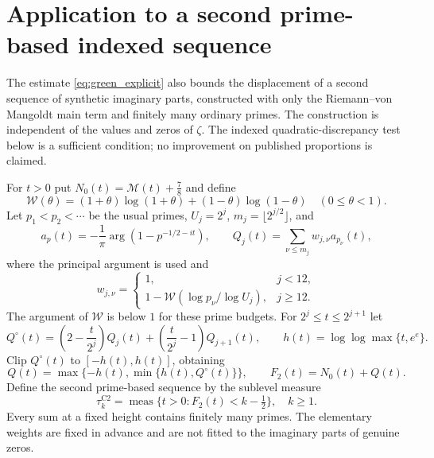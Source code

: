\documentclass[11pt,reqno]{amsart}
\numberwithin{equation}{section}
\theoremstyle{definition}
\theoremstyle{remark}
\newcommand{\main}{\mathcal M}
\begin{document}
\section{Application to a second prime-based indexed sequence}\label{sec:tauC2}

The estimate \eqref{eq:green_explicit} also bounds the displacement of
a second sequence of synthetic imaginary parts, constructed with only the
Riemann--von Mangoldt main term and finitely many ordinary primes.
The construction is independent of the values and zeros of $\zeta$.
The indexed quadratic-discrepancy test below is a sufficient condition;
no improvement on published proportions is claimed.

For $t>0$ put $N_0(t)=\main(t)+\frac78$ and define
\[
\mathscr W(\theta)
 =(1+\theta)\log(1+\theta)+(1-\theta)\log(1-\theta)
 \quad(0\le\theta<1).
\]
Let $p_1<p_2<\cdots$ be the usual primes,
$U_j=2^j$, $m_j=\lfloor2^{j/2}\rfloor$, and
\[
 a_p(t)=-\frac1\pi\arg(1-p^{-1/2-it}),\qquad
 Q_j(t)=\sum_{\nu\le m_j}w_{j,\nu}a_{p_\nu}(t),
\]
where the principal argument is used and
\begin{equation}
 w_{j,\nu}=
 \begin{cases}
 1,&j<12,\\[2pt]
 1-\mathscr W(\log p_\nu/\log U_j),&j\ge12.
 \end{cases}
 \label{eq:tauC2_weights_v8}
\end{equation}
The argument of $\mathscr W$ is below $1$ for these prime budgets.
For $2^j\le t\le2^{j+1}$ let
\[
 Q^\circ(t)=\left(2-\frac{t}{2^j}\right)Q_j(t)
       +\left(\frac{t}{2^j}-1\right)Q_{j+1}(t),
 \qquad h(t)=\log\log\max\{t,e^e\}.
\]
Clip $Q^\circ(t)$ to $[-h(t),h(t)]$, obtaining
\[
 Q(t)=\max\{-h(t),\min\{h(t),Q^\circ(t)\}\},\qquad
 F_2(t)=N_0(t)+Q(t).
\]
Define the second prime-based sequence by the sublevel measure
\begin{equation}
 \boxed{\displaystyle
 \tau_k^{\mathrm{C2}}=
 \operatorname{meas}\{t>0:F_2(t)<k-\tfrac12\},\quad k\ge1.}
 \label{eq:tauC2_v8}
\end{equation}
Every sum at a fixed height contains finitely many primes.
The elementary weights are fixed in advance and are not fitted to
the imaginary parts of genuine zeros.
\end{document}
